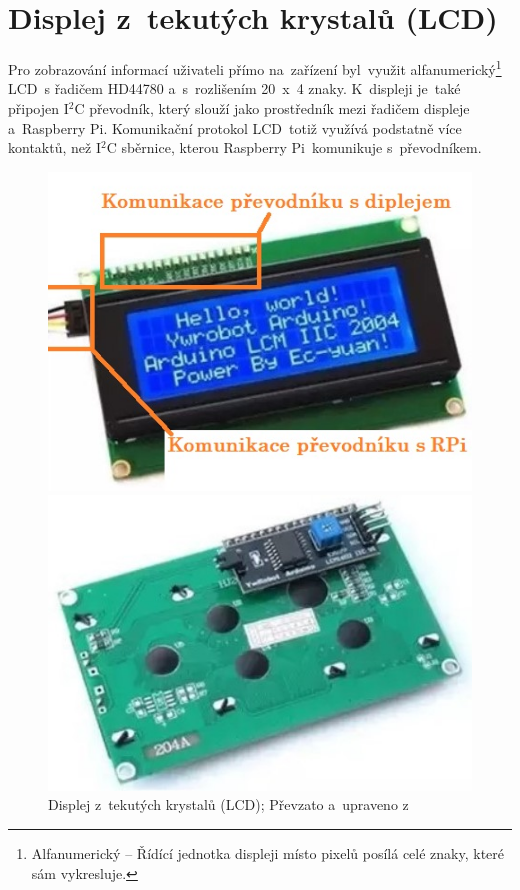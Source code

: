 \section{Displej z~tekutých krystalů (LCD)}
Pro zobrazování informací uživateli přímo na~zařízení byl~využit alfanumerický\footnote{Alfanumerický -- Řídící jednotka displeji místo pixelů posílá celé znaky, které sám vykresluje.} LCD~s řadičem HD44780 a~s~rozlišením 20~x~4 znaky. K~displeji je~také připojen I$^{2}$C převodník, který slouží jako prostředník mezi řadičem displeje a~Raspberry Pi.
Komunikační protokol LCD~totiž využívá podstatně více kontaktů, než I$^{2}$C sběrnice, kterou Raspberry Pi~komunikuje s~převodníkem.

\begin{figure}[htb]
  \centering
  \begin{minipage}{0.45\textwidth}
    \centering
    \includegraphics[width=1\textwidth]{img/LCD_front.jpg} %
    \caption{\label{fig:LCD_front} Displej z~tekutých krystalů (LCD); Převzato a~upraveno z~\cite{laskakit-LCD}}
  \end{minipage}\hfill
  \begin{minipage}{0.45\textwidth}
    \centering
    \includegraphics[width=1\textwidth]{img/LCD_back.jpg} %

\end{minipage}
\end{figure}
